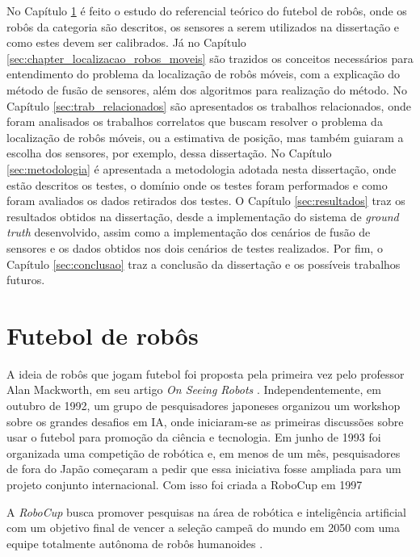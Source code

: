 \documentclass[acronym, symbols, table, deposito]{fei}
\begin{document}
		No Capítulo \ref{sec:chapter_futebol_robos} é feito o estudo do referencial teórico do futebol de robôs, onde os robôs da categoria  são descritos, os sensores a serem utilizados na dissertação e como estes devem ser calibrados. Já no Capítulo \ref{sec:chapter_localizacao_robos_moveis} são trazidos os conceitos necessários para entendimento do problema da localização de robôs móveis, com a explicação do método de fusão de sensores, além dos algoritmos para realização do método. No Capítulo \ref{sec:trab_relacionados} são apresentados os trabalhos relacionados, onde foram analisados os trabalhos correlatos que buscam resolver o problema da localização de robôs móveis, ou a estimativa de posição, mas também guiaram a escolha dos sensores, por exemplo, dessa dissertação. No Capítulo \ref{sec:metodologia} é apresentada a metodologia adotada nesta dissertação, onde estão descritos os testes, o domínio onde os testes foram performados e como foram avaliados os dados retirados dos testes. O Capítulo \ref{sec:resultados} traz os resultados obtidos na dissertação, desde a implementação do sistema de \textit{ground truth} desenvolvido, assim como a implementação dos cenários de fusão de sensores e os dados obtidos nos dois cenários de testes realizados. Por fim, o Capítulo \ref{sec:conclusao} traz a conclusão da dissertação e os possíveis trabalhos futuros.

	\chapter{Futebol de robôs}\label{sec:chapter_futebol_robos}
	
		A ideia de robôs que jogam futebol foi proposta pela primeira vez pelo professor Alan Mackworth, em seu artigo \textit{On Seeing Robots} \cite{OnSeeingRobots}. Independentemente, em outubro de 1992, um grupo de pesquisadores japoneses organizou um workshop sobre os grandes desafios em IA, onde iniciaram-se as primeiras discussões sobre usar o futebol para promoção da ciência e tecnologia. Em junho de 1993 foi organizada uma competição de robótica e, em menos de um mês, pesquisadores de fora do Japão começaram a pedir que essa iniciativa fosse ampliada para um projeto conjunto internacional. Com isso foi criada a RoboCup em 1997 \cite{RoboCup}
		
		A \textit{RoboCup} busca promover pesquisas na área de robótica e inteligência artificial com um objetivo final de vencer a seleção campeã do mundo em 2050 com uma equipe totalmente autônoma de robôs humanoides \cite{RoboCup}.
		
\end{document}
